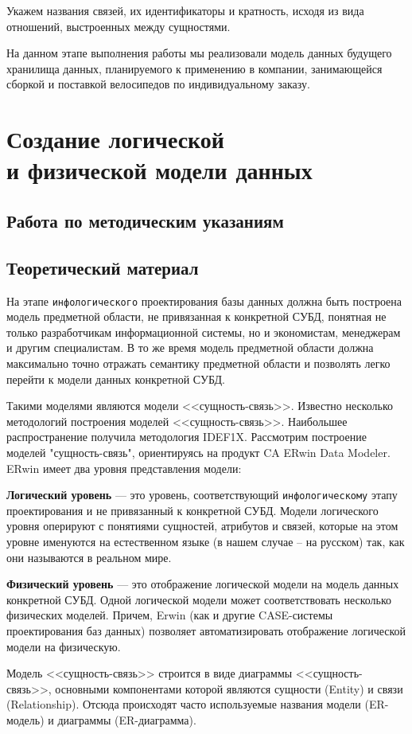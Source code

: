 \documentclass[a4paper,14pt]{extarticle}
\newcommand{\methodsection}{Работа по методическим указаниям}
\begin{document}
Укажем названия связей, их идентификаторы и кратность, исходя из вида отношений, выстроенных между сущностями.

На данном этапе выполнения работы мы реализовали модель данных будущего хранилища данных, планируемого к применению в компании, занимающейся сборкой и поставкой велосипедов по индивидуальному заказу.

\section{Создание логической\\и физической модели данных}
\subsection{\methodsection}
\subsection*{Теоретический материал}
На этапе \texttt{инфологического} проектирования базы данных должна быть построена
модель предметной области, не привязанная к конкретной СУБД, понятная не только
разработчикам информационной системы, но и экономистам, менеджерам и другим
специалистам. В то же время модель предметной области должна максимально точно
отражать семантику предметной области и позволять легко перейти к модели данных
конкретной СУБД.

Такими моделями являются модели <<сущность-связь>>. Известно несколько
методологий построения моделей <<сущность-связь>>. Наибольшее распространение
получила методология IDEF1X. Рассмотрим построение моделей "сущность-связь",
ориентируясь на продукт CA ERwin Data Modeler. ERwin имеет два уровня
представления модели:

\textbf{Логический уровень} --- это уровень, соответствующий \texttt{инфологическому} этапу проектирования
и не привязанный к конкретной СУБД. Модели логического уровня оперируют с
понятиями сущностей, атрибутов и связей, которые на этом уровне именуются на
естественном языке (в нашем случае – на русском) так, как они называются в
реальном мире.

\textbf{Физический уровень} --- это отображение логической модели на модель данных
конкретной СУБД. Одной логической модели может соответствовать несколько
физических моделей. Причем, Erwin (как и другие CASE-системы проектирования баз
данных) позволяет автоматизировать отображение логической модели на физическую.

Модель <<сущность-связь>> строится в виде диаграммы <<сущность-связь>>,
основными компонентами которой являются сущности (Entity) и связи\\(Relationship).
Отсюда происходят часто используемые названия модели (ER-модель) и диаграммы
(ER-диаграмма).
\end{document}
